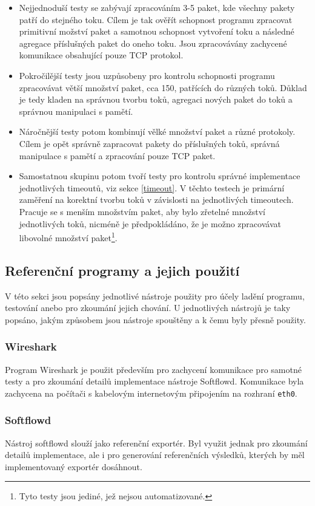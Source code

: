 \documentclass[11pt, a4paper, hidelinks]{article}[08.10.2023]
\begin{document}
    \begin{itemize}
        \item{Nejjednoduší testy se zabývají zpracováním 3-5 paket, kde všechny pakety patří do stejného toku. Cílem je tak ověřít schopnost programu zpracovat primitivní možství paket a samotnou schopnost vytvoření toku a následné agregace příslušných paket do oneho toku. Jsou zpracovávány zachycené komunikace obsahující pouze TCP protokol.} 
        \item{Pokročilější testy jsou uzpůsobeny pro kontrolu schopnosti programu zpracovávat větší množství paket, cca 150, patřících do různých toků. Důklad je tedy kladen na správnou tvorbu toků, agregaci nových paket do toků a správnou manipulaci s pamětí.}
        \item{Náročnější testy potom kombinují vělké množství paket a různé protokoly. Cílem je opět správně zapracovat pakety do příslušných toků, správná manipulace s pamětí a zpracování pouze TCP paket.}
        \item{Samostatnou skupinu potom tvoří testy pro kontrolu správné implementace jednotlivých timeoutů, viz sekce \ref{timeout}. V těchto testech je primární zaměření na korektní tvorbu toků v závislosti na jednotlivých timeoutech. Pracuje se s menším množstvím paket, aby bylo zřetelné množství jednotlivých toků, nicméně je předpokládáno, že je možno zpracovávat libovolné množství paket\footnote{Tyto testy jsou jediné, jež nejsou automatizované.}.}
    \end{itemize}
  
    \subsection{Referenční programy a jejich použití}\label{refer_nastroje}
    V této sekci jsou popsány jednotlivé nástroje použity pro účely ladění programu, testování anebo pro zkoumání jejich chování. U jednotlivých nástrojů je taky popsáno, jakým způsobem jsou nástroje spouštěny a k čemu byly přesně použity.
    \subsubsection{Wireshark}
    Program Wireshark je použit především pro zachycení komunikace pro samotné testy a pro zkoumání detailů implementace nástroje Softflowd. Komunikace byla zachycena na počítači s kabelovým internetovým připojením na rozhraní \texttt{eth0}.
    \subsubsection{Softflowd}
    Nástroj softflowd slouží jako referenční exportér. Byl využit jednak pro zkoumání detailů implementace, ale i pro generování referenčních výsledků, kterých by měl implementovaný exportér dosáhnout.
\end{document}
